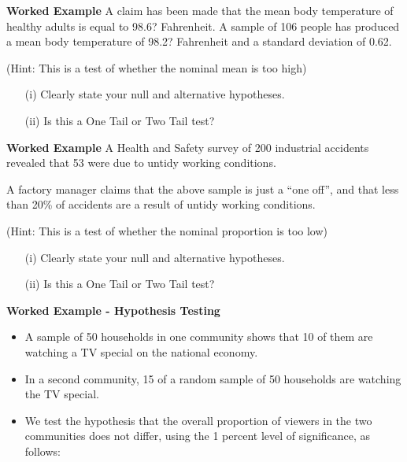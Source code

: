 	
	\item \textbf{Worked Example}
	A claim has been made that the mean body temperature of healthy adults is equal to 98.6? Fahrenheit. A sample of 106 people has produced a mean body temperature of 98.2? Fahrenheit and a standard deviation of 0.62. 
	
	(Hint: This is a test of whether the nominal mean is too high)
	\begin{itemize}
		\item[(i)] Clearly state your null and alternative hypotheses.
		\item[(ii)] Is this a One Tail or Two Tail test?
	\end{itemize}
	
	\item \textbf{Worked Example}
	A Health and Safety survey of 200 industrial accidents revealed that 53 
	were due to untidy working conditions.  
	
	A factory manager claims that the above sample is just a “one off”, and that less than 20\% of accidents are a result of untidy working conditions. 
	
	(Hint: This is a test of whether the nominal proportion is too low)
	\begin{itemize}
		\item[(i)] Clearly state your null and alternative hypotheses.
		\item[(ii)] Is this a One Tail or Two Tail test?
	\end{itemize}
	
	
	
	\item \textbf{Worked Example   - Hypothesis Testing}	
	
	\begin{itemize}
		\item A sample of 50 households in one community
		shows that 10 of them are watching a TV special on the national
		economy. 
		\item In a second community, 15 of a random sample of 50
		households are watching the TV special. 
		\item We test the hypothesis
		that the overall proportion of viewers in the two communities does
		not differ, using the 1 percent level of significance, as follows:
	\end{itemize}
	
